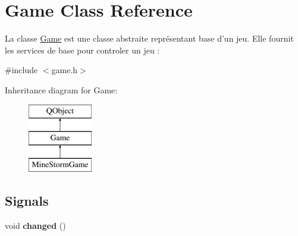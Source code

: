 \hypertarget{classGame}{\section{Game Class Reference}
\label{classGame}
}


La classe \hyperlink{classGame}{Game} est une classe abstraite représentant base d'un jeu. Elle fournit les services de base pour controler un jeu \-:  




{\ttfamily \#include $<$game.\-h$>$}

Inheritance diagram for Game\-:\begin{figure}[H]
\begin{center}
\leavevmode
\includegraphics[height=3.000000cm]{classGame}
\end{center}
\end{figure}
\subsection*{Signals}
\begin{DoxyCompactItemize}
\item 
\hypertarget{classGame_aa56256a804a59c9031e6eb1fd9e70dc7}{void {\bfseries changed} ()}\label{classGame_aa56256a804a59c9031e6eb1fd9e70dc7}

\end{DoxyCompactItemize}
